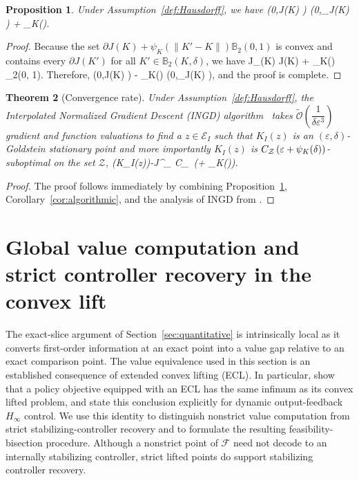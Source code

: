 \documentclass[letterpaper,10pt,conference]{ieeeconf}
\def\[#1\]{\begin{align*}#1\end{align*}}
\providecommand{\cF}{\mathcal{F}}
\providecommand{\cE}{\mathcal{E}}
\providecommand{\cZ}{\mathcal{Z}}
\providecommand{\distop}{\operatorname{dist}}
\renewcommand{\^}[1]{^{(#1)}}
\let\tilde\widetilde
\newtheorem{theorem}{Theorem}
\newtheorem{proposition}[theorem]{Proposition}
\begin{document}
\begin{proposition}\label{prop:clarke_to_gold}
    Under Assumption~\ref{def:Hausdorff}, we have
    \[
    \distop\!\bigl(0,\partial J(K) \bigr) \leq \distop\!\bigl(0,\partial_\delta J(K) \bigr) + \psi_K(\delta).
    \]
\end{proposition}
\begin{proof}
    Because the set $\partial J(K) + \psi_K(\| K' - K \|) \mathbb{B}_2(0, 1)$ is convex and contains every $\partial J(K')$ for all $K' \in \mathbb{B}_2(K, \delta)$, we have
    \[
    \partial J_\delta(K) \subset \partial J(K) + \psi_K(\delta) _2(0, 1).
    \]
    Therefore,
    \[
    \distop\!\bigl(0,\partial J(K) \bigr) - \psi_K(\delta) \leq \distop\!\bigl(0,\partial_\delta J(K) \bigr),
    \]
    and the proof is complete.
\end{proof}


\begin{theorem}[Convergence rate]
    Under Assumption~\ref{def:Hausdorff}, the Interpolated Normalized Gradient Descent (INGD) algorithm~\citep{zhang2020complexity} takes $\tilde{\mathcal{O}}(\dfrac{1}{ \delta \varepsilon^3})$ gradient and function valuations to find a $z \in \cE_I$ such that $K_I(z)$ is an $(\varepsilon, \delta)$-Goldstein stationary point and more importantly $K_I(z)$ is $C_{\cZ}\, \mleft(\varepsilon + \psi_K(\delta)\mright)$-suboptimal on the set $$,
    \[
    J\bigl(K_I(z)\bigr)-J^{}_{\cZ}
    \le
    C_{\cZ}\, \mleft(\varepsilon + \psi_K(\delta)\mright).
    \]
\end{theorem}
\begin{proof}
    The proof follows immediately by combining Proposition~\ref{prop:clarke_to_gold}, Corollary~\ref{cor:algorithmic}, and the analysis of INGD from \citet[Theorem~3.2]{davis2022gradient}.
\end{proof}

\section{Global value computation and strict controller recovery in the convex lift}\label{sec:global-value}
The exact-slice argument of Section~\ref{sec:quantitative} is intrinsically local as it converts first-order information at an exact point into a value gap relative to an exact comparison point. The value equivalence used in this section is an established consequence of extended convex lifting (ECL). In particular, \citet[Theorem~2.1]{zheng2025extended} show that a policy objective equipped with an ECL has the same infimum as its convex lifted problem, and \citet[Corollary~4.1]{zheng2025extended} state this conclusion explicitly for dynamic output-feedback $H_\infty$ control. We use this identity to distinguish nonstrict value computation from strict stabilizing-controller recovery and to formulate the resulting feasibility-bisection procedure. Although a nonstrict point of $\cF$ need not decode to an internally stabilizing controller, strict lifted points do support stabilizing controller recovery.
\end{document}
